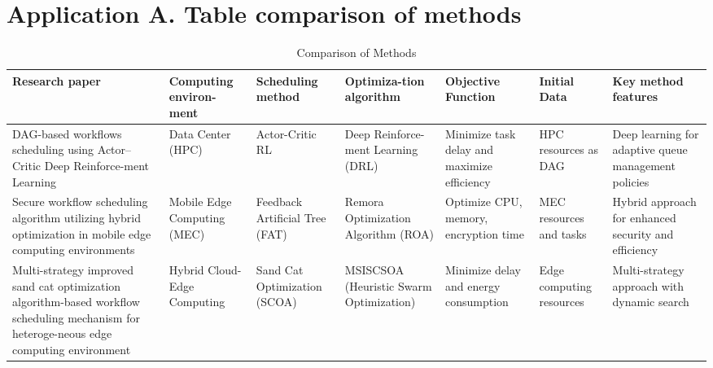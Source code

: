 \documentclass[a4paper, final]{article}
\begin{document}
\section* {Application A. Table comparison of methods}
\hypertarget{ApplA}{}
\begin{table}[H]
    \centering
    \caption{Comparison of Methods}
    \label{tbl:1}
    \scriptsize
    \begin{tabularx}{\textwidth}{|p{3.5cm}|X|X|p{2cm}|X|X|X|}
    \hline
    \textbf{Research paper} & \textbf{Computing environ-ment} & \textbf{Scheduling method} & 
    \textbf{Optimiza-tion algorithm} & \textbf{Objective Function} & \textbf{Initial Data} & 
    \textbf{Key method features} \\
    \hline

    DAG-based workflows scheduling using Actor–Critic Deep Reinforce-ment Learning \cite{bib:1_acrl} &
    Data Center (HPC) &
    Actor-Critic RL &
    Deep Reinforce-ment Learning (DRL) &
    Minimize task delay and maximize efficiency &
    HPC resources as DAG &
    Deep learning for adaptive queue management policies \\
    \hline

    Secure workflow scheduling algorithm utilizing hybrid optimization in mobile edge computing environments \cite{bib:2_faro} &
    Mobile Edge Computing (MEC) &
    Feedback Artificial Tree (FAT) &
    Remora Optimization Algorithm (ROA) &
    Optimize CPU, memory, encryption time &
    MEC resources and tasks &
    Hybrid approach for enhanced security and efficiency \\
    \hline

    Multi-strategy improved sand cat optimization algorithm-based workflow scheduling mechanism for heteroge-neous edge computing environment \cite{bib:3_sandcat} &
    Hybrid Cloud-Edge Computing &
    Sand Cat Optimization (SCOA) &
    MSISCSOA (Heuristic Swarm Optimization) &
    Minimize delay and energy consumption &
    Edge computing resources &
    Multi-strategy approach with dynamic search \\
    \hline


\end{tabularx}
\end{table}
\end{document}
